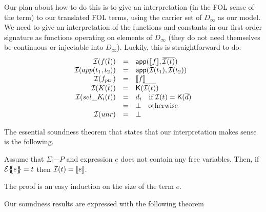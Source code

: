 Our plan about how to do this is to give an interpretation (in the FOL sense of the term) to our
translated FOL terms, using the carrier set of $D_\infty$ as our model.
We need to give an interpretation of the functions and constants in our
first-order signature as functions operating on elements of $D_\infty$ (they do not need themselves
be continuous or injectable into $D_\infty$). Luckily, this is straightforward to do:
\[\begin{array}{rcl}
   {\cal I}(f(\overline{t})) & = & \mathsf{app}([\![f]\!],\overline{{\cal I}(t)}) \\
   {\cal I}(app(t_1,t_2))     & = & \mathsf{app}({\cal I}(t_1), {\cal I}(t_2)) \\
   {\cal I}(f_{ptr})  & = & [\![f]\!] \\
   {\cal I}(K(\overline{t})) & = & \mathsf{K}(\overline{{\cal I}(t)}) \\
   {\cal I}(\mathop{sel\_K\!_{i}}(t)) & = &  d_i \quad \mbox{if}\; {\cal I}(t) = \mathsf{K}(\overline{d}) \\
                           & = & \bot \quad \mbox{otherwise} \\
  {\cal I}(unr)       & = & \bot
\end{array}\]

The essential soundness theorem that states that our interpretation makes sense is
the following.
\begin{theorem}\label{thm:interp-respect}
Assume that $\Sigma |- P$ and expression $e$ does not contain any free variables.
Then, if ${\cal E}\{\!\!\{e\}\!\!\} = t$ then ${\cal I}(t) = [\![e]\!]$.
\end{theorem}
The proof is an easy induction on the size of the term $e$.

Our soundness results are expressed with the following theorem

